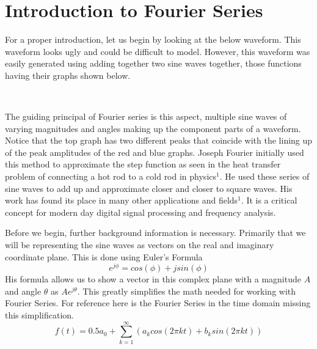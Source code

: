 \documentclass[12pt]{article}
\begin{document}
\section{Introduction to Fourier Series}
For a proper introduction, let us begin by looking at the below waveform. This waveform looks ugly and could be difficult to model. However, this waveform was easily generated using adding together two sine waves together, those functions having their graphs shown below.\\
\\

The guiding principal of Fourier series is this aspect, multiple sine waves of varying magnitudes and angles making up the component parts of a waveform. Notice that the top graph has two different peaks that coincide with the lining up of the peak amplitudes of the red and blue graphs. Joseph Fourier initially used this method to approximate the step function as seen in the heat transfer problem of connecting a hot rod to a cold rod in physics$^1$. He used these series of sine waves to add up and approximate closer and closer to square waves. His work has found its place in many other applications and fields$^1$. It is a critical concept for modern day digital signal processing and frequency analysis.

Before we begin, further background information is necessary. Primarily that we will be representing the sine waves as vectors on the real and imaginary coordinate plane. This is done using Euler's Formula $$ e^{j \phi} = cos(\phi) + jsin(\phi)$$ His formula allows us to show a vector in this complex plane with a magnitude $A$ and angle $\theta$ as $Ae^{j\theta}$. This greatly simplifies the math needed for working with Fourier Series. For reference here is the Fourier Series in the time domain missing this simplification. $$f(t) = 0.5a_0 + \sum_{k=1}^{\infty}(a_kcos(2\pi kt) + b_ksin(2 \pi kt))$$
\end{document}
